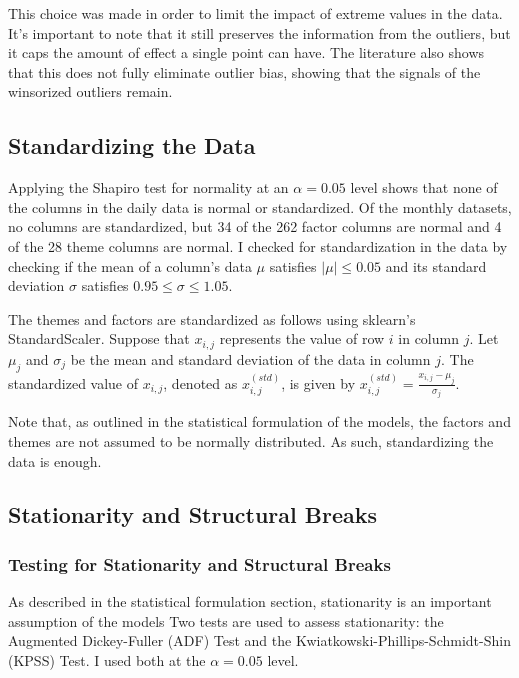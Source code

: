 This choice was made in order to limit the impact of extreme values in the data. It's important to note that it still preserves the information from the outliers, but it caps the amount of effect a single point can have. The literature also shows that this does not fully eliminate outlier bias, showing that the signals of the winsorized outliers remain. 

\subsection{Standardizing the Data}

Applying the Shapiro test for normality at an $\alpha=0.05$ level shows that none of the columns in the daily data is normal or standardized. Of the monthly datasets, no columns are standardized, but 34 of the 262 factor columns are normal and 4 of the 28 theme columns are normal. I checked for standardization in the data by checking if the mean of a column's data $\mu$ satisfies $|\mu|\leq 0.05$ and its standard deviation $\sigma$ satisfies $0.95\leq \sigma\leq 1.05$.

The themes and factors are standardized as follows using sklearn's StandardScaler. Suppose that $x_{i,j}$ represents the value of row $i$ in column $j$. Let $\mu_j$ and $\sigma_j$ be the mean and standard deviation of the data in column $j$. The standardized value of $x_{i,j}$, denoted as $x_{i,j}^{(std)}$, is given by $x_{i,j}^{(std)}=\frac{x_{i,j}-\mu_j}{\sigma_j}$.

Note that, as outlined in the statistical formulation of the models, the factors and themes are not assumed to be normally distributed. As such, standardizing the data is enough.

\subsection{Stationarity and Structural Breaks}

\subsubsection{Testing for Stationarity and Structural Breaks}

As described in the statistical formulation section, stationarity is an important assumption of the models Two tests are used to assess stationarity: the Augmented Dickey-Fuller (ADF) Test and the Kwiatkowski-Phillips-Schmidt-Shin (KPSS) Test. I used both at the $\alpha=0.05$ level.

